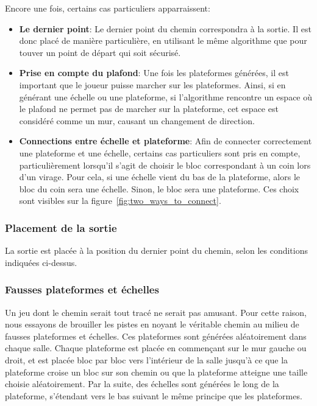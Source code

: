 \documentclass[10pt]{report}
\begin{document}
Encore une fois, certains cas particuliers apparraissent:
\begin{itemize}
  \item \textbf{Le dernier point}: Le dernier point du chemin correspondra 
  à la sortie. Il est donc placé de manière particulière, en utilisant le
  même algorithme que pour touver un point de départ qui soit sécurisé.
  \item \textbf{Prise en compte du plafond}: Une fois les plateformes
  générées, il est important que le joueur puisse marcher sur les 
  plateformes. Ainsi, si en générant une échelle ou une plateforme, si
  l'algorithme rencontre un espace où le plafond ne permet pas de marcher
  sur la plateforme, cet espace est considéré comme un mur, causant un
  changement de direction.
  \item \textbf{Connections entre échelle et plateforme}: Afin de connecter
  correctement une plateforme et une échelle, certains cas particuliers
  sont pris en compte, particulièrement lorsqu'il s'agit de choisir le bloc
  correspondant à un coin lors d'un virage. Pour cela, si une échelle vient
  du bas de la plateforme, alors le bloc du coin sera une échelle.
  Sinon, le bloc sera une plateforme. Ces choix sont visibles sur la
  figure~\ref{fig:two_ways_to_connect}.
\end{itemize}

\subsubsection{Placement de la sortie}

La sortie est placée à la position du dernier point du chemin, selon
les conditions indiquées ci-dessus.

\subsubsection{Fausses plateformes et échelles}

Un jeu dont le chemin serait tout tracé ne serait pas amusant. Pour cette
raison, nous essayons de brouiller les pistes en noyant le véritable chemin
au milieu de fausses plateformes et échelles. Ces plateformes sont générées
aléatoirement dans chaque salle. Chaque plateforme est placée en commençant
sur le mur gauche ou droit, et est placée bloc par bloc vers l'intérieur
de la salle jusqu'à ce que la plateforme croise un bloc sur son chemin ou
que la plateforme atteigne une taille choisie aléatoirement. Par la suite,
des échelles sont générées le long de la plateforme, s'étendant vers le bas
suivant le même principe que les plateformes.
\end{document}

